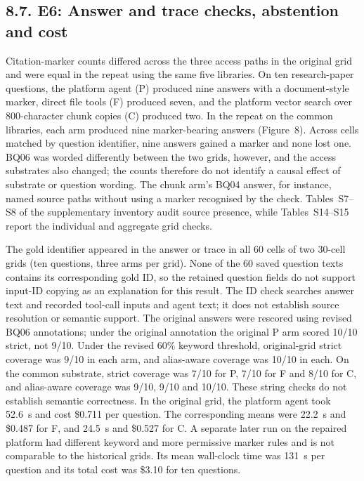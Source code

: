 \subsection{8.7. E6: Answer and trace checks, abstention and cost}


Citation-marker counts differed across the three access paths in the original
grid and were equal in the repeat using the same five libraries. On ten research-paper
questions, the platform agent (P) produced nine answers with a
document-style marker, direct file tools (F) produced seven, and the
platform vector search over 800-character chunk copies (C) produced two.
In the repeat on the common libraries, each arm produced nine marker-bearing
answers (Figure~8). Across cells matched by question identifier,
nine answers gained a marker and none lost one. BQ06 was worded differently
between the two grids, however, and the access substrates also changed; the
counts therefore do not identify a causal effect of substrate or question
wording. The chunk arm's BQ04 answer, for
instance, named source paths without using a marker recognised by the
check. Tables~S7--S8 of the supplementary inventory audit source presence,
while Tables~S14--S15 report the individual and aggregate grid checks.

The gold identifier appeared in the answer or trace in all 60 cells of two
30-cell grids (ten questions, three arms per grid).
None of the 60 saved question texts contains its corresponding gold ID, so
the retained question fields do not support input-ID copying as an explanation
for this result. The ID check searches answer text and recorded tool-call
inputs and agent text; it does not establish source resolution or semantic
support. The original answers were rescored using revised BQ06 annotations;
under the original annotation the original P arm scored 10/10 strict, not
9/10. Under the revised 60\% keyword threshold, original-grid strict
coverage was 9/10 in each arm, and alias-aware coverage was 10/10 in each.
On the common substrate, strict coverage was 7/10 for P, 7/10 for F and
8/10 for C, and alias-aware coverage
was 9/10, 9/10 and 10/10. These string checks do not establish semantic
correctness. In the original grid, the platform agent took 52.6~s and cost
\$0.711 per question. The corresponding means were 22.2~s and \$0.487 for
F, and 24.5~s and \$0.527 for C. A separate later run on the repaired
platform had different keyword and more permissive marker rules and is not
comparable to the historical grids. Its mean wall-clock time was 131~s per
question and its total cost was \$3.10 for ten questions.

